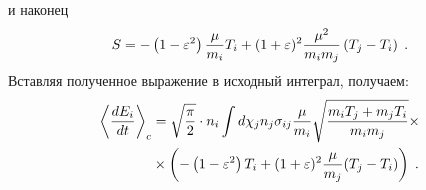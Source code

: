и наконец
\begin{equation}
  S = -\left(1-\varepsilon^2\right)\frac{\mu}{m_i}T_i+(1+\varepsilon)^2\frac{\mu^2}{m_im_j}\left(T_j-T_i\right)\;.
\end{equation}
Вставляя полученное выражение в исходный интеграл, получаем:
\begin{equation}\label{eq:cooling_rate_interm}
  \begin{split}
    \left\langle\frac{dE_i}{dt}\right\rangle_c &= \sqrt{\frac{\pi}{2}}\cdot n_i\int d\chi_jn_j\sigma_{ij}\frac{\mu}{m_i}
    \sqrt{\frac{m_iT_j+m_jT_i}{m_im_j}}\times \\
    &\times\left(-\left(1-\varepsilon^2\right)T_i+(1+\varepsilon)^2\frac{\mu}{m_j}(T_j-T_i)\right)\;.    
  \end{split}
\end{equation}

